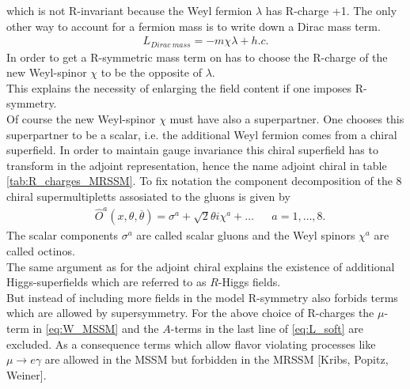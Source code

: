 which is not R-invariant because the Weyl fermion $\lambda$ has R-charge +1. The only other way to account for a fermion mass is to write down a Dirac mass term.
\begin{align}
L_{Dirac\ mass} = -m \chi\lambda + h.c.
\end{align}
In order to get a R-symmetric mass term on has to choose the R-charge of the new Weyl-spinor $\chi$ to be the opposite of $\lambda$.\\
This explains the necessity of enlarging the field content if one imposes R-symmetry.\\
Of course the new Weyl-spinor $\chi$ must have also a superpartner. One chooses this superpartner to be a scalar, i.e. the additional Weyl fermion comes from a chiral superfield. In order to maintain gauge invariance this chiral superfield has to transform in the adjoint representation, hence the name adjoint chiral in table \ref{tab:R_charges_MRSSM}. To fix notation the component decomposition of the 8 chiral supermultipletts assosiated to the gluons is given by
\begin{align}
&\hat{O}^a(x, \theta, \overline{\theta}) = \sigma^a + \sqrt{2}\theta i\chi^a + \hdots && a = 1,\hdots,8.
\end{align}
The scalar components $\sigma^a$ are called scalar gluons and the Weyl spinors $\chi^a$ are called octinos.\\
The same argument as for the adjoint chiral explains the existence of additional Higgs-superfields which are referred to as $R$-Higgs fields.\\
But instead of including more fields in the model R-symmetry also forbids terms which are allowed by supersymmetry. For the above choice of R-charges the $\mu$-term in \ref{eq:W_MSSM} and the $A$-terms in the last line of \ref{eq:L_soft} are excluded. As a consequence terms which allow flavor violating processes like $\mu \to e \gamma$ are allowed in the MSSM but forbidden in the MRSSM [Kribs, Popitz, Weiner].



